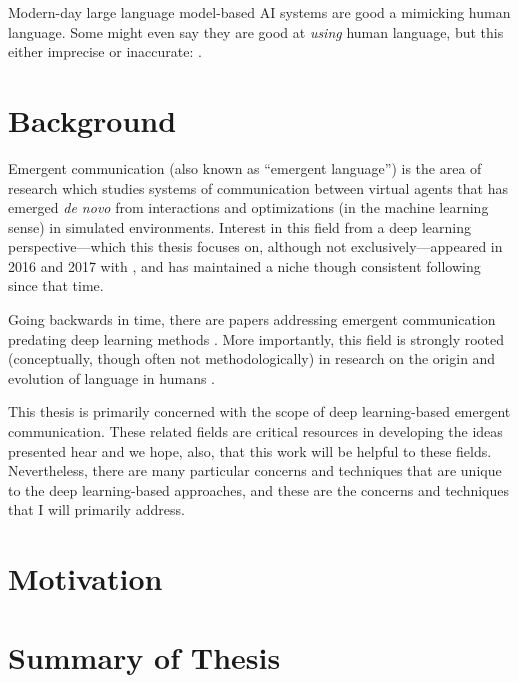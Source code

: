 Modern-day large language model-based AI systems are good a mimicking human language.
Some might even say they are good at \emph{using} human language, but this either imprecise or inaccurate:
  .



\section{Background}

Emergent communication (also known as ``emergent language'') is the area of research which studies systems of communication between virtual agents that has emerged \emph{de novo} from interactions and optimizations (in the machine learning sense) in simulated environments.
Interest in this field from a deep learning perspective---which this thesis focuses on, although not exclusively---appeared in 2016 and 2017 with , and has maintained a niche though consistent following since that time.

Going backwards in time, there are papers addressing emergent communication predating deep learning methods .
More importantly, this field is strongly rooted (conceptually, though often not methodologically) in research on the origin and evolution of language in humans .

This thesis is primarily concerned with the scope of deep learning-based emergent communication.
These related fields are critical resources in developing the ideas presented hear and we hope, also, that this work will be helpful to these fields.
Nevertheless, there are many particular concerns and techniques that are unique to the deep learning-based approaches, and these are the concerns and techniques that I will primarily address.



\section{Motivation}



\section{Summary of Thesis}


